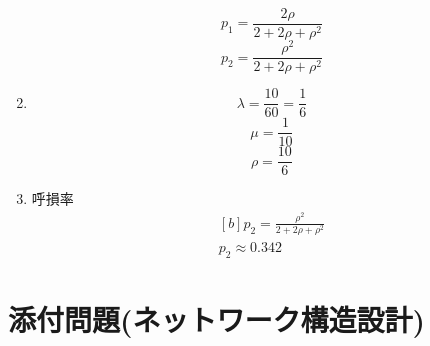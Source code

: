 \documentclass{report}
\begin{document}
\begin{CJK}{UTF8}{min}
\begin{enumerate}
\begin{equation}
              \end{equation}
              \begin{equation}
                  p_1=\frac{2\rho}{2+2\rho+\rho^2}
              \end{equation}
              \begin{equation}
                  p_2=\frac{\rho^2}{2+2\rho+\rho^2}
              \end{equation}
        \item
              \begin{equation}
                  \lambda=\frac{10}{60}=\frac{1}{6}
              \end{equation}
              \begin{equation}
                  \mu=\frac{1}{10}
              \end{equation}
              \begin{equation}
                  \rho=\frac{10}{6}
              \end{equation}
        \item 呼損率
              \begin{equation}
                  \begin{aligned}[b]
                      p_2=\frac{\rho^2}{2+2\rho+\rho^2} \\
                      p_2\approx0.342
                  \end{aligned}
              \end{equation}
    \end{enumerate}

    \clearpage
    \section*{添付問題(ネットワーク構造設計)}

\end{CJK}
\end{document}
